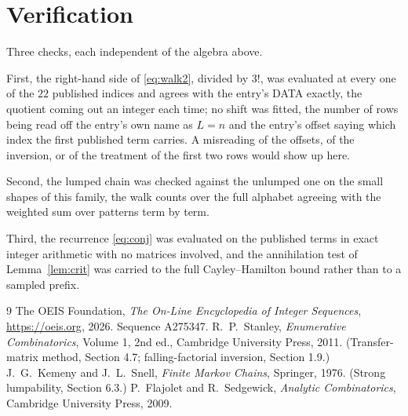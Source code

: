 \documentclass[11pt,a4paper]{article}
\theoremstyle{plain}
\theoremstyle{definition}
\begin{document}
\section{Verification}

Three checks, each independent of the algebra above.

First, the right-hand side of \eqref{eq:walk2}, divided by $3!$, was evaluated at every
one of the $22$ published indices and agrees with the entry's DATA exactly, the quotient
coming out an integer each time; no shift was fitted, the number of rows being read off the
entry's own name as $L=n$ and the entry's offset saying which index the first published
term carries. A misreading of the offsets, of the inversion, or of the treatment of the first
two rows would show up here.

Second, the lumped chain was checked against the unlumped one on the small shapes of this
family, the walk counts over the full alphabet agreeing with the weighted sum over patterns
term by term.

Third, the recurrence \eqref{eq:conj} was evaluated on the published terms in exact integer
arithmetic with no matrices involved, and the annihilation test of Lemma~\ref{lem:crit} was
carried to the full Cayley--Hamilton bound rather than to a sampled prefix.

\begin{thebibliography}{9}
 The OEIS Foundation, \emph{The On-Line Encyclopedia of Integer
Sequences}, \url{https://oeis.org}, 2026. Sequence A275347.
 R.~P.~Stanley, \emph{Enumerative Combinatorics}, Volume 1, 2nd ed.,
Cambridge University Press, 2011. (Transfer-matrix method, Section 4.7; falling-factorial
inversion, Section 1.9.)
 J.~G.~Kemeny and J.~L.~Snell, \emph{Finite Markov Chains}, Springer,
1976. (Strong lumpability, Section 6.3.)
 P.~Flajolet and R.~Sedgewick, \emph{Analytic Combinatorics}, Cambridge
University Press, 2009.
\end{thebibliography}
\end{document}
